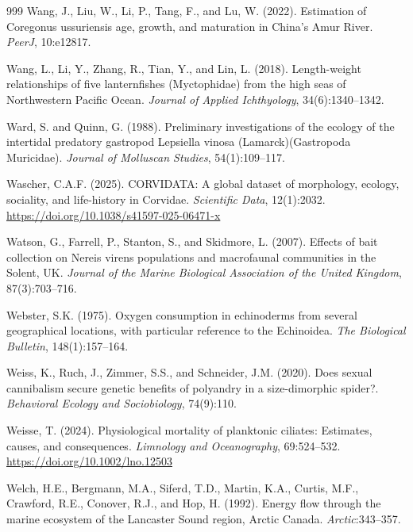 \begin{thebibliography}{999}
Wang, J., Liu, W., Li, P., Tang, F., and Lu, W. (2022). Estimation of Coregonus ussuriensis age, growth, and maturation in China's Amur River. \textit{PeerJ}, 10:e12817.

Wang, L., Li, Y., Zhang, R., Tian, Y., and Lin, L. (2018). Length-weight relationships of five lanternfishes (Myctophidae) from the high seas of Northwestern Pacific Ocean. \textit{Journal of Applied Ichthyology}, 34(6):1340--1342.

Ward, S. and Quinn, G. (1988). Preliminary investigations of the ecology of the intertidal predatory gastropod Lepsiella vinosa (Lamarck)(Gastropoda Muricidae). \textit{Journal of Molluscan Studies}, 54(1):109--117.

Wascher, C.A.F. (2025). CORVIDATA: A global dataset of morphology, ecology, sociality, and life-history in Corvidae. \textit{Scientific Data}, 12(1):2032. \url{https://doi.org/10.1038/s41597-025-06471-x}

Watson, G., Farrell, P., Stanton, S., and Skidmore, L. (2007). Effects of bait collection on Nereis virens populations and macrofaunal communities in the Solent, UK. \textit{Journal of the Marine Biological Association of the United Kingdom}, 87(3):703--716.

Webster, S.K. (1975). Oxygen consumption in echinoderms from several geographical locations, with particular reference to the Echinoidea. \textit{The Biological Bulletin}, 148(1):157--164.

Weiss, K., Ruch, J., Zimmer, S.S., and Schneider, J.M. (2020). Does sexual cannibalism secure genetic benefits of polyandry in a size-dimorphic spider?. \textit{Behavioral Ecology and Sociobiology}, 74(9):110.

Weisse, T. (2024). Physiological mortality of planktonic ciliates: Estimates, causes, and consequences. \textit{Limnology and Oceanography}, 69:524--532. \url{https://doi.org/10.1002/lno.12503}

Welch, H.E., Bergmann, M.A., Siferd, T.D., Martin, K.A., Curtis, M.F., Crawford, R.E., Conover, R.J., and Hop, H. (1992). Energy flow through the marine ecosystem of the Lancaster Sound region, Arctic Canada. \textit{Arctic}:343--357.


\end{thebibliography}
